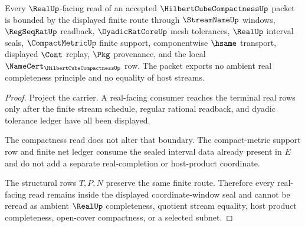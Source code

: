 \begin{theorem}
\label{thm:hilbert-cube-compactness-real-seal-boundary}
Every $\RealUp$-facing read of an accepted $\HilbertCubeCompactnessUp$ packet is bounded by the displayed finite route through $\StreamNameUp$ windows, $\RegSeqRatUp$ readback, $\DyadicRatCoreUp$ mesh tolerances, $\RealUp$ interval seals, $\CompactMetricUp$ finite support, componentwise $\hsame$ transport, displayed $\Cont$ replay, $\Pkg$ provenance, and the local $\NameCert_{\HilbertCubeCompactnessUp}$ row. The packet exports no ambient real completeness principle and no equality of host streams.
\end{theorem}
\begin{proof}
Project the carrier. A real-facing consumer reaches the terminal real rows only after the finite stream schedule, regular rational readback, and dyadic tolerance ledger have all been displayed.

The compactness read does not alter that boundary. The compact-metric support row and finite net ledger consume the sealed interval data already present in $E$ and do not add a separate real-completion or host-product coordinate.

The structural rows $T,P,N$ preserve the same finite route. Therefore every real-facing read remains inside the displayed coordinate-window seal and cannot be reread as ambient $\RealUp$ completeness, quotient stream equality, host product completeness, open-cover compactness, or a selected subnet.
\end{proof}


